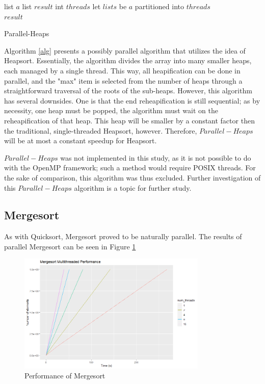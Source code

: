 \documentclass[conference]{IEEEtran}
\begin{document}
	\begin{algorithm}
		\SetAlgoLined
		list $a$\;
		list $result$\;
		int $threads$\;
		let $lists$ be $a$ partitioned into $threads$\\
		\Return $result$
		\caption{Parallel-Heaps}
		\label{alg}
	\end{algorithm}
	Algorithm \ref{alg} presents a possibly parallel algorithm that utilizes the idea of Heapsort.
	Essentially, the algorithm divides the array into many smaller heaps, each managed by a single thread.
	This way, all heapification can be done in parallel, and the "max" item is selected from the number of heaps through a straightforward traversal of the roots of the sub-heaps.
	However, this algorithm has several downsides.
	One is that the end reheapification is still sequential; as by necessity, one heap must be popped, the algorithm must wait on the reheapification of that heap.
	This heap will be smaller by a constant factor then the traditional, single-threaded Heapsort, however.
	Therefore, $Parallel-Heaps$ will be at most a constant speedup for Heapsort.
	
	$Parallel-Heaps$ was not implemented in this study, as it is not possible to do with the OpenMP framework; such a method would require POSIX threads.
	For the sake of comparison, this algorithm was thus excluded.
	Further investigation of this $Parallel-Heaps$ algorithm is a topic for further study.  
	\subsection{Mergesort}
	As with Quicksort, Mergesort proved to be naturally parallel.
	The results of parallel Mergesort can be seen in Figure \ref{ms_per}
	\begin{figure}[h]
		\includegraphics[width=9cm]{ms_per.png}
		\caption{Performance of Mergesort}
		\label{ms_per}
	\end{figure}
	
\end{document}
